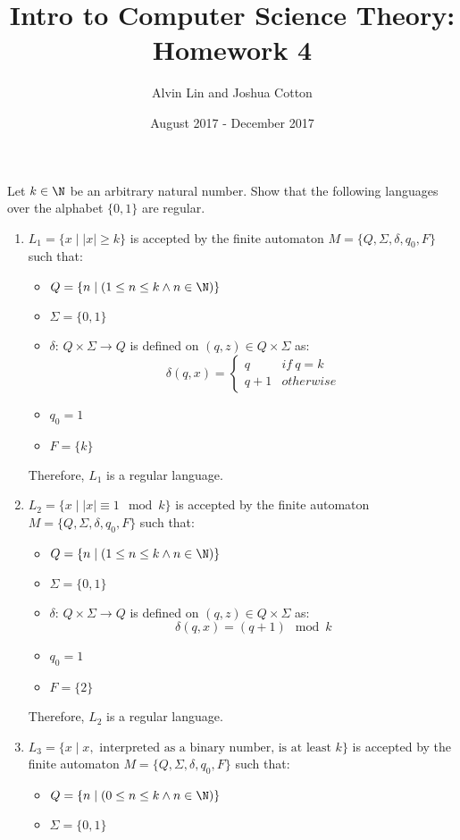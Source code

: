 \documentclass{math}
\title{Intro to Computer Science Theory: Homework 4}
\author{Alvin Lin and Joshua Cotton}
\date{August 2017 - December 2017}
\begin{document}
\maketitle

Let \( k\in\N \) be an arbitrary natural number. Show that the following
languages over the alphabet \( \{0,1\} \) are regular.
\begin{enumerate}
  \item \( L_1 = \{x\mid|x|\ge k\} \) is accepted by the finite automaton
  \( M = \{Q,\Sigma,\delta,q_0,F\} \) such that:
  \begin{itemize}
    \item \( Q = \{n\mid(1\le n\le k \wedge n\in\N)\} \)
    \item \( \Sigma = \{0,1\} \)
    \item \( \delta \): \( Q\times\Sigma\to Q \) is defined on \( (q,z)\in
    Q\times\Sigma \) as:
    \[ \delta(q,x) = \begin{cases}
      q & if\ q = k \\
      q+1 & otherwise
    \end{cases} \]
    \item \( q_0 = 1 \)
    \item \( F = \{k\} \)
  \end{itemize}
  Therefore, \( L_1 \) is a regular language.
  \item \( L_2 = \{x\mid|x|\equiv1\mod k\} \) is accepted by the finite
  automaton \( M = \{Q,\Sigma,\delta,q_0,F\} \) such that:
  \begin{itemize}
    \item \( Q = \{n\mid(1\le n\le k \wedge n\in\N)\} \)
    \item \( \Sigma = \{0,1\} \)
    \item \( \delta \): \( Q\times\Sigma\to Q \) is defined on \( (q,z)\in
    Q\times\Sigma \) as:
    \[ \delta(q,x) = (q+1)\mod k \]
    \item \( q_0 = 1 \)
    \item \( F = \{2\} \)
  \end{itemize}
  Therefore, \( L_2 \) is a regular language.
  \item \( L_3 = \{x\mid x,\text{ interpreted as a binary number, is at least
  } k\} \) is accepted by the finite automaton \( M = \{Q,\Sigma,\delta,q_0,F\}
  \) such that:
  \begin{itemize}
    \item \( Q = \{n\mid(0\le n\le k \wedge n\in\N)\} \)
    \item \( \Sigma = \{0,1\} \)

\end{itemize}
\end{enumerate}
\end{document}
